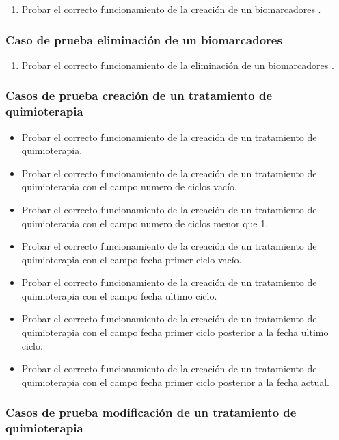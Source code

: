 \begin{enumerate}
    \item Probar el correcto funcionamiento de la creación de un biomarcadores .
\end{enumerate}

\subsubsection{Caso de prueba eliminación de un biomarcadores}

\begin{enumerate}
    \item Probar el correcto funcionamiento de la eliminación de un biomarcadores .
\end{enumerate}

\subsubsection{Casos de prueba creación de un tratamiento de quimioterapia}

\begin{itemize}
    \item Probar el correcto funcionamiento de la creación de un tratamiento de quimioterapia.
    \item Probar el correcto funcionamiento de la creación de un tratamiento de quimioterapia con el campo numero de ciclos vacío.
    \item Probar el correcto funcionamiento de la creación de un tratamiento de quimioterapia con el campo numero de ciclos menor que 1.
    \item Probar el correcto funcionamiento de la creación de un tratamiento de quimioterapia con el campo fecha primer ciclo vacío.
    \item Probar el correcto funcionamiento de la creación de un tratamiento de quimioterapia con el campo fecha ultimo ciclo.
    \item Probar el correcto funcionamiento de la creación de un tratamiento de quimioterapia con el campo fecha primer ciclo posterior a la fecha ultimo ciclo.
    \item Probar el correcto funcionamiento de la creación de un tratamiento de quimioterapia con el campo fecha primer ciclo posterior a la fecha actual.
\end{itemize}

\subsubsection{Casos de prueba modificación de un tratamiento de quimioterapia}

